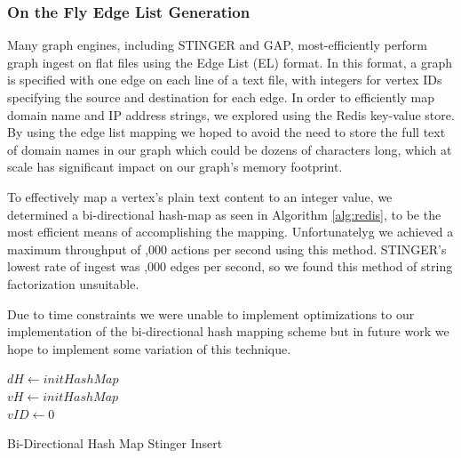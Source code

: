 \documentclass{acm_proc_article-sp}
\begin{document}
\subsubsection{On the Fly Edge List Generation}
Many graph engines, including STINGER and GAP, most-efficiently perform graph ingest on flat files using the Edge List (EL) format. In this format, a graph is specified with one edge on each line of a text file, with integers for vertex IDs specifying the source and destination for each edge. In order to efficiently map domain name and IP address strings, we explored using the Redis key-value store. By using the edge list mapping we hoped to avoid the need to store the full text of domain names in our graph which could be dozens of characters long, which at scale has significant impact on our graph's memory footprint.

To effectively map a vertex's plain text content to an integer value, we determined a bi-directional hash-map as seen in Algorithm \ref{alg:redis}, to be the most efficient means of accomplishing the mapping.
Unfortunatelyg we achieved a maximum throughput of ,000 actions per second using this method. STINGER's lowest rate of ingest was ,000 edges per second, so we found this method of string factorization unsuitable.

Due to time constraints we were unable to implement optimizations to our implementation of the bi-directional hash mapping scheme but in future work we hope to implement some variation of this technique.

\begin{algorithm}
\SetAlgoLined
{}
 $dH \leftarrow initHashMap$\\
 $vH \leftarrow initHashMap$\\
 $vID \leftarrow 0$\\
\caption{Bi-Directional Hash Map Stinger Insert}\label{alg:redis}
\end{algorithm}
\end{document}
